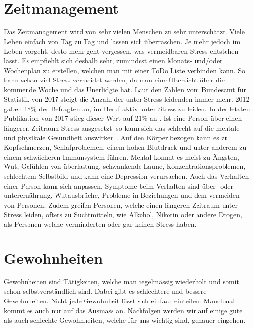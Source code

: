 \section{Zeitmanagement}
\authortoc{\jonas}{\sectionident}
Das Zeitmanagement wird von sehr vielen Menschen zu sehr unterschätzt. Viele Leben einfach von Tag zu Tag und lassen sich überraschen. Je mehr jedoch im Leben vorgeht, desto mehr geht vergessen, was vermeidbaren Stress entstehen lässt. 
\newline
Es empfiehlt sich deshalb sehr, zumindest einen Monats- und/oder Wochenplan zu erstellen, welchen man mit einer ToDo Liste verbinden kann. So kann schon viel Stress vermeidet werden, da man eine Übersicht über die kommende Woche und das Unerlidgte hat. 
\newline
Laut den Zahlen vom Bundesamt für Statistik von 2017 steigt die Anzahl der unter Stress leidenden immer mehr. 2012 gaben 18\% der Befragten an, im Beruf aktiv unter Stress zu leiden. In der letzten Publikation von 2017 stieg dieser Wert auf 21\% an \cite{bundesamtfrstatistik_2019_arbeitsbedingungen}. Ist eine Person über einen längeren Zeitraum Stress ausgesetzt, so kann sich das schlecht auf die mentale und physikale Gesundheit auswirken \cite{stress-symptoms}. Auf den Körper bezogen kann es zu Kopfschmerzen, Schlafproblemen, einem hohen Blutdruck und unter anderem zu einem schwächeren Immunsystem führen. Mental kommt es meist zu Ängsten, Wut, Gefühlen von überlastung, schwankende Laune, Konzentrationsproblemen, schlechtem Selbstbild und kann eine Depression verursachen. Auch das Verhalten einer Person kann sich anpassen. Symptome beim Verhalten sind über- oder unterernährung, Wutausbrüche, Probleme in Beziehungen und dem vermeiden von Personen. Zudem greifen Personen, welche einen längeren Zeitraum unter Stress leiden, ofters zu Suchtmitteln, wie Alkohol, Nikotin oder andere Drogen, als Personen welche verminderten oder gar keinen Stress haben.
\section{Gewohnheiten}
\authortoc{\dario}{\sectionident}
Gewohnheiten sind Tätigkeiten, welche man regelmässig wiederholt und somit schon selbstverständlich sind. Dabei gibt es schlechtere und bessere Gewohnheiten.
\newline
Nicht jede Gewohnheit lässt sich einfach einteilen. Manchmal kommt es auch nur auf das Ausmass an.
\newline
Nachfolgen werden wir auf einige gute als auch schlechte Gewohnheiten, welche für uns wichtig sind, genauer eingehen. 
\newline
